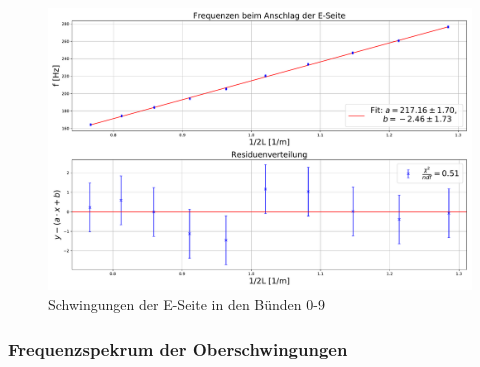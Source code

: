 \documentclass[a4paper, 11pt]{article}
\begin{document}
\begin{figure}[H]
	\centering
	\includegraphics[scale=0.4]{../Plots/E-Seite.pdf}
	\caption{Schwingungen der E-Seite in den Bünden 0-9}
	\label{fig:ESaite}
\end{figure}


\subsubsection{Frequenzspekrum der Oberschwingungen}


\clearpage
\listoffigures
\listoftables
\end{document}
